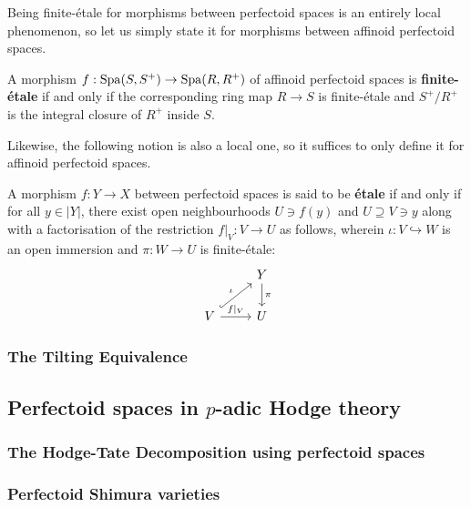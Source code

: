             Being finite-\'etale for morphisms between perfectoid spaces is an entirely local phenomenon, so let us simply state it for morphisms between affinoid perfectoid spaces.
            \begin{definition} \label{def: finite_etale_morphisms_of_perfectoid_spaces}
                A morphism $f: \operatorname{Spa}(S, S^+) \to \operatorname{Spa}(R, R^+)$ of affinoid perfectoid spaces is \textbf{finite-\'etale} if and only if the corresponding ring map $R \to S$ is finite-\'etale and $S^+/R^+$ is the integral closure of $R^+$ inside $S$.  
            \end{definition}
            Likewise, the following notion is also a local one, so it suffices to only define it for affinoid perfectoid spaces.
            \begin{definition} \label{def: strongly_finite_etale_morphisms_of_perfectoid_spaces}
                
            \end{definition}
            \begin{definition} \label{def: etale_morphisms_of_perfectoid_spaces}
                A morphism $f: Y \to X$ between perfectoid spaces is said to be \textbf{\'etale} if and only if for all $y \in |Y|$, there exist open neighbourhoods $U \ni f(y)$ and $U \supseteq V \ni y$ along with a factorisation of the restriction $f|_V: V \to U$ as follows, wherein $\iota: V \hookrightarrow W$ is an open immersion and $\pi: W \to U$ is finite-\'etale:
                    $$
                        \begin{tikzcd}
                        	& Y \\
                        	V & U
                        	\arrow["\iota", hook, from=2-1, to=1-2]
                        	\arrow["{f|_V}", from=2-1, to=2-2]
                        	\arrow["\pi", from=1-2, to=2-2]
                        \end{tikzcd}
                    $$
            \end{definition}
            
        \subsubsection{The Tilting Equivalence}
        
    \subsection{Perfectoid spaces in \texorpdfstring{$p$}{}-adic Hodge theory}
        \subsubsection{The Hodge-Tate Decomposition using perfectoid spaces}
        
        \subsubsection{Perfectoid Shimura varieties}
